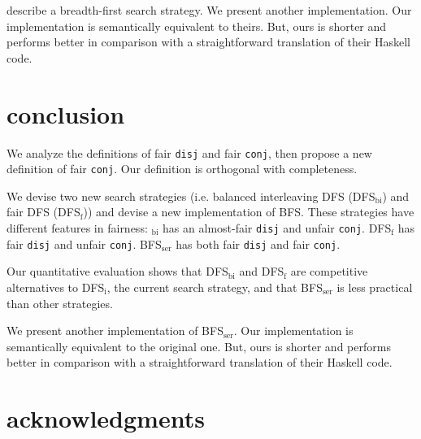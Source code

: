 \documentclass[format=acmlarge, review=true, authordraft=true]{acmart}
\newcommand{\conj}{\texttt{conj}}
\newcommand{\disj}{\texttt{disj}}
\newcommand{\DFSi }[0]{DFS$_\textrm{i}$}
\newcommand{\DFSf }[0]{DFS$_\textrm{f}$}
\newcommand{\DFSbi}[0]{DFS$_\textrm{bi}$}
\newcommand{\BFSser}[0]{BFS$_\textrm{ser}$}
\begin{document}
\citet{seres1999algebra} describe a breadth-first search 
strategy. We present another implementation. Our implementation is semantically 
equivalent to theirs. But, ours is shorter and performs better in comparison 
with a straightforward translation of their Haskell code.


\section{conclusion}

We analyze the definitions of fair \disj{} and fair \conj{}, then propose a 
new definition of fair \conj{}. Our definition is orthogonal with completeness.

We devise two new search strategies (i.e. balanced interleaving DFS 
(\DFSbi{}) and fair DFS (\DFSf{})) and devise a new 
implementation of BFS. These strategies have different features 
in fairness: $_\textrm{bi}$ has an almost-fair \disj{} and unfair \conj{}. 
\DFSf{} has fair \disj{} and unfair \conj{}. \BFSser{} has both fair
\disj{} and fair \conj{}.

Our quantitative evaluation shows that \DFSbi{} and \DFSf{} are 
competitive 
alternatives to \DFSi{}, the current search strategy, and that 
\BFSser{} is less practical than other strategies.

We present another implementation of \BFSser. Our implementation is 
semantically equivalent to the original one. But, ours is shorter and performs 
better in comparison with a straightforward translation of their Haskell code.




\section*{acknowledgments}



\end{document}
